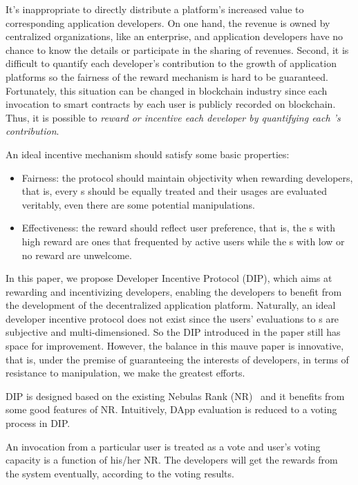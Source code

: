 It's inappropriate to directly distribute a platform's increased value to
corresponding application developers. On one hand, the revenue is owned by
centralized organizations, like an enterprise, and application developers have
no chance to know the details or participate in the sharing of revenues. Second, it
is difficult to quantify each developer's contribution to the growth of
application platforms so the fairness of the reward mechanism is hard to be guaranteed. Fortunately, this situation can be changed in blockchain
industry since each invocation to smart contracts by each user is
publicly recorded on blockchain. Thus, it is possible to \emph{reward or incentive each \dapp developer by
quantifying each \dapp's contribution}.

An ideal incentive mechanism should satisfy some basic properties:
\begin{itemize}

\item Fairness: the protocol should maintain objectivity when rewarding developers, that is, every {\dapp}s should be equally treated and their usages are evaluated veritably, even there are some potential manipulations.

\item Effectiveness: the reward should reflect user preference, that is, the {\dapp}s with high reward are ones that frequented by active users while the {\dapp}s with low or no reward are unwelcome.
\end{itemize}


In this paper, we propose Developer Incentive Protocol (DIP), which aims at rewarding and incentivizing  developers, enabling the developers to benefit from the development of the decentralized application platform. Naturally, an ideal developer incentive protocol does not exist since the users' evaluations to  {\dapp}s are subjective and multi-dimensioned. So the DIP introduced in the paper still has space for improvement. However, the balance in this mauve paper is innovative, that is, under the premise of guaranteeing the interests of \dapp developers, in terms of resistance to manipulation, we make the greatest efforts.

DIP is designed based on the existing Nebulas Rank
(NR)~\cite{Nebulasyellowpaper} and it benefits from some good features of NR\@.
Intuitively, DApp evaluation is reduced to a voting process in DIP\@.

An invocation from a particular user is treated as a vote and user's voting
capacity is a function of his/her NR\@. The developers will get the rewards from the system eventually, according to the voting results.

